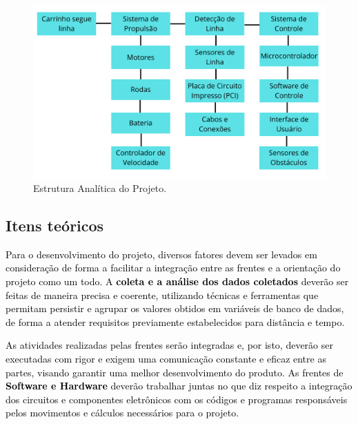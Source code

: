 \begin{figure}[htpb]
\centering
\includegraphics[width=\textwidth]{figuras/EAP.png}
\caption{Estrutura Analítica do Projeto.}
\label{EAP}
\end{figure}


\subsection{Itens teóricos}

\textcolor{black}{Para o desenvolvimento do projeto, diversos fatores devem ser levados em consideração de forma a facilitar a integração entre as frentes e a orientação do projeto como um todo. A \textbf{coleta e a análise dos dados coletados} deverão ser feitas de maneira precisa e coerente, utilizando técnicas e ferramentas que permitam persistir e agrupar os valores obtidos em variáveis de banco de dados, de forma a atender requisitos previamente estabelecidos para distância e tempo.}

\textcolor{black}{ As atividades realizadas pelas frentes serão integradas e, por isto, deverão ser executadas com rigor e exigem uma comunicação constante e eficaz entre as partes, visando garantir uma melhor desenvolvimento do produto. As frentes de \textbf{Software e Hardware} deverão trabalhar juntas no que diz respeito a integração dos circuitos e componentes eletrônicos com os códigos e programas responsáveis pelos movimentos e cálculos necessários para o projeto.}

